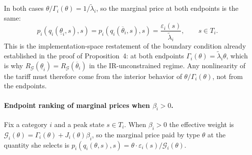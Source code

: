 \documentclass{class}
\begin{document}
In both cases $\theta/\Gamma_i(\theta) = 1/\tilde{\lambda}_i$, so the marginal price at both endpoints is the same:
\[
p_i\!\left(q_i(\underline{\theta}_i,s),s\right) = p_i\!\left(q_i(\overline{\theta}_i,s),s\right) = \frac{\varepsilon_i(s)}{\tilde{\lambda}_i}, \qquad s \in T_i.
\]
This is the implementation-space restatement of the boundary condition already established in the proof of Proposition~4: at both endpoints $\Gamma_i(\theta) = \tilde{\lambda}_i\theta$, which is why $R_{\mathcal{G}}(\underline{\theta}_i) = R_{\mathcal{G}}(\overline{\theta}_i)$ in the IR-unconstrained regime. Any nonlinearity of the tariff must therefore come from the interior behavior of $\theta/\Gamma_i(\theta)$, not from the endpoints.

\paragraph{Endpoint ranking of marginal prices when $\beta_i > 0$.}
Fix a category $i$ and a peak state $s \in T_i$. When $\beta_i > 0$ the effective weight is $\mathcal{G}_i(\theta) = \Gamma_i(\theta) + J_i(\theta)\beta_i$, so the marginal price paid by type $\theta$ at the quantity she selects is $p_i(q_i(\theta,s),s) = \theta \cdot \varepsilon_i(s)/\mathcal{G}_i(\theta)$.
\end{document}

